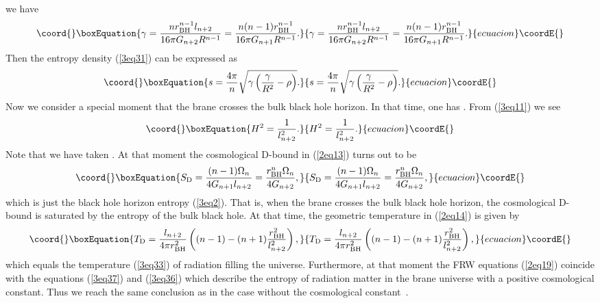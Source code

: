\documentclass[a4paper,12pt]{article}
\begin{document}
we have
\begin{equation}\coord{}\boxEquation{
\label{3eq36}
 \gamma =\frac{nr_{\rm BH}^{n-1}l_{n+2}}{16\pi
G_{n+2}R^{n-1}}
       =\frac{n(n-1)r_{\rm BH}^{n-1}}{16\pi G_{n+1} R^{n-1}}.
 }{
\gamma =\frac{nr_{\rm BH}^{n-1}l_{n+2}}{16\pi
G_{n+2}R^{n-1}}
       =\frac{n(n-1)r_{\rm BH}^{n-1}}{16\pi G_{n+1} R^{n-1}}.
 }{ecuacion}\coordE{}\end{equation}
Then the entropy density (\ref{3eq31}) can be
expressed as
\begin{equation}\coord{}\boxEquation{
\label{3eq37}
 s=\frac{4\pi }{n}\sqrt{\gamma
\left(\frac{\gamma}{R^2}-\rho \right)}.
}{
s=\frac{4\pi }{n}\sqrt{\gamma
\left(\frac{\gamma}{R^2}-\rho \right)}.
}{ecuacion}\coordE{}\end{equation}
Now we consider a special moment that the brane crosses the bulk
black hole horizon. In that time, one has \coordHE{}. From
(\ref{3eq11}) we see
\begin{equation}\coord{}\boxEquation{
H^2 =\frac{1}{l_{n+2}^2}.
}{
H^2 =\frac{1}{l_{n+2}^2}.
}{ecuacion}\coordE{}\end{equation}
Note that we have taken \coordHE{}. At that moment
the cosmological D-bound in (\ref{2eq13}) turns out to be
\begin{equation}\coord{}\boxEquation{
S_{\rm D}= \frac{( n-1)\Omega_n}{4G_{n+1}l_{n+2}}
             =\frac{ r_{\rm BH}^n \Omega_n}{4G_{n+2}},
}{
S_{\rm D}= \frac{( n-1)\Omega_n}{4G_{n+1}l_{n+2}}
             =\frac{ r_{\rm BH}^n \Omega_n}{4G_{n+2}},
}{ecuacion}\coordE{}\end{equation}
which is just the black hole horizon entropy (\ref{3eq2}). That
is, when the brane  crosses the bulk black hole horizon,
the cosmological D-bound is saturated by the entropy of the bulk
black hole. At that time, the geometric temperature in
(\ref{2eq14}) is given by
\begin{equation}\coord{}\boxEquation{
T_{\rm D} =\frac{l_{n+2}}{4\pi r_{\rm BH}^2}\left ((n-1) -(n+1)
\frac{r_{\rm BH}^2}{l_{n+2}^2}\right),
}{
T_{\rm D} =\frac{l_{n+2}}{4\pi r_{\rm BH}^2}\left ((n-1) -(n+1)
\frac{r_{\rm BH}^2}{l_{n+2}^2}\right),
}{ecuacion}\coordE{}\end{equation}
which equals  the temperature (\ref{3eq33}) of radiation filling
the universe. Furthermore,  at that moment the
FRW equations (\ref{2eq19}) coincide with the equations
(\ref{3eq37}) and (\ref{3eq36}) which describe the entropy of
radiation matter in the brane universe with a positive
cosmological constant. Thus we reach the same conclusion as in the case
without the cosmological constant~\cite{SV}.
\end{document}
